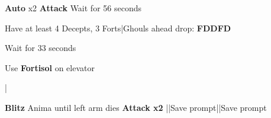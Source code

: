 \begin{mainlist}
	\item {} \textbf{Auto} x2 \to \textbf{Attack}
		\to Wait for 56 seconds
	\item Have at least 4 Decepts, 3 Forts|Ghouls ahead drop: \textbf{FDDFD}
	\item {} Wait for 33 seconds
	\item Use \textbf{Fortisol} on elevator
	\item {}|\skip
	\item {} \textbf{Blitz} Anima until left arm dies \to
		\textbf{Attack x2} ||Save prompt||Save prompt
\end{mainlist}
